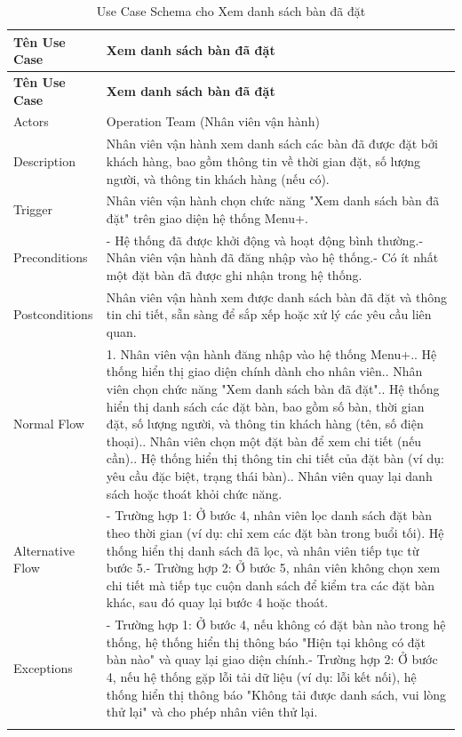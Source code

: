 \begin{itemize}
        \begin{longtable}{|p{3cm}|p{12cm}|}
        \hline
        \textbf{Tên Use Case} & \textbf{Xem danh sách bàn đã đặt} \\ 
        \hline
        \endfirsthead
        \hline
        \textbf{Tên Use Case} & \textbf{Xem danh sách bàn đã đặt} \\ 
        \endhead
        \hline
        \endfoot
        \hline
        \endlastfoot
        Actors & Operation Team (Nhân viên vận hành) \\ 
        \hline
        Description & Nhân viên vận hành xem danh sách các bàn đã được đặt bởi khách hàng, bao gồm thông tin về thời gian đặt, số lượng người, và thông tin khách hàng (nếu có). \\
        \hline
        Trigger & Nhân viên vận hành chọn chức năng "Xem danh sách bàn đã đặt" trên giao diện hệ thống Menu+. \\
        \hline
        Preconditions & - Hệ thống đã được khởi động và hoạt động bình thường.\newline- Nhân viên vận hành đã đăng nhập vào hệ thống.\newline- Có ít nhất một đặt bàn đã được ghi nhận trong hệ thống. \\
        \hline
        Postconditions & Nhân viên vận hành xem được danh sách bàn đã đặt và thông tin chi tiết, sẵn sàng để sắp xếp hoặc xử lý các yêu cầu liên quan. \\
        \hline
        Normal Flow & 1. Nhân viên vận hành đăng nhập vào hệ thống Menu+.\newline2. Hệ thống hiển thị giao diện chính dành cho nhân viên.\newline3. Nhân viên chọn chức năng "Xem danh sách bàn đã đặt".\newline4. Hệ thống hiển thị danh sách các đặt bàn, bao gồm số bàn, thời gian đặt, số lượng người, và thông tin khách hàng (tên, số điện thoại).\newline5. Nhân viên chọn một đặt bàn để xem chi tiết (nếu cần).\newline6. Hệ thống hiển thị thông tin chi tiết của đặt bàn (ví dụ: yêu cầu đặc biệt, trạng thái bàn).\newline7. Nhân viên quay lại danh sách hoặc thoát khỏi chức năng. \\
        \hline
        Alternative Flow & - Trường hợp 1: Ở bước 4, nhân viên lọc danh sách đặt bàn theo thời gian (ví dụ: chỉ xem các đặt bàn trong buổi tối). Hệ thống hiển thị danh sách đã lọc, và nhân viên tiếp tục từ bước 5.\newline- Trường hợp 2: Ở bước 5, nhân viên không chọn xem chi tiết mà tiếp tục cuộn danh sách để kiểm tra các đặt bàn khác, sau đó quay lại bước 4 hoặc thoát. \\
        \hline
        Exceptions & - Trường hợp 1: Ở bước 4, nếu không có đặt bàn nào trong hệ thống, hệ thống hiển thị thông báo "Hiện tại không có đặt bàn nào" và quay lại giao diện chính.\newline- Trường hợp 2: Ở bước 4, nếu hệ thống gặp lỗi tải dữ liệu (ví dụ: lỗi kết nối), hệ thống hiển thị thông báo "Không tải được danh sách, vui lòng thử lại" và cho phép nhân viên thử lại. \\
        \hline
        \caption{Use Case Schema cho Xem danh sách bàn đã đặt}\\
        \end{longtable}

    \end{itemize}

    